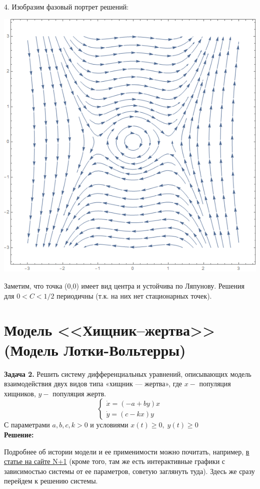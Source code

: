 \documentclass[10pt]{report}
\begin{document}
4. Изобразим фазовый портрет решений:
\begin{center}
{\includegraphics[scale=0.4]{graph12.1.png}} 
\end{center}
Заметим, что точка (0,0) имеет вид центра и устойчива по Ляпунову. Решения для $0<C<1/2$ периодичны (т.к. на них нет стационарных точек).
\section {Модель <<Хищник--жертва>> (Модель Лотки-Вольтерры)}
\textbf{Задача 2.} Решить систему дифференциальных уравнений, описывающих модель взаимодействия двух видов типа «хищник — жертва», где $x -$ популяция хищников, $y -$ популяция жертв.
\begin{equation}
\left\{
\begin{array}{lr}
\dot{x}=(-a+by)x\\
\dot{y}=(c-kx)y
\end{array}
\right.
\end{equation}
С параметрами $a,b,c,k>0$ и условиями $x(t) \geq 0, \;  y(t) \geq 0$\\
\textbf{Решение:}

Подробнее об истории модели и ее применимости можно почитать, например, \href{https://nplus1.ru/material/2019/12/04/lotka-volterra-model}{ в статье на сайте N+1} (кроме того, там же есть интерактивные графики с зависимостью системы от ее параметров, советую заглянуть туда). Здесь же сразу перейдем  к решению системы.
\end{document}
